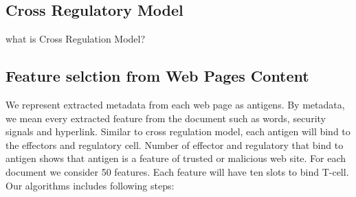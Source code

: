 \documentclass{llncs}
\begin{document}
\subsection{Cross Regulatory Model}
what is Cross Regulation Model?


\subsection{Feature selction from Web Pages Content}
We represent extracted metadata from each web page as antigens. By metadata, we mean every extracted feature from the document such as words, security signals and hyperlink. Similar to cross regulation model, each antigen will bind to the effectors and regulatory cell. Number of effector and regulatory that bind to antigen shows that antigen is a feature of trusted or malicious web site.
For each document we consider 50 features. Each feature will have ten slots to bind T-cell. \\
Our algorithms includes following steps: 
\end{document}
